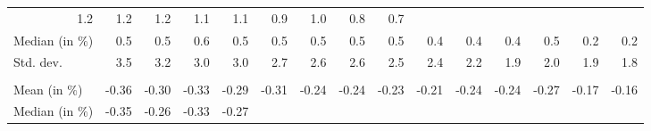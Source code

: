 \begin{tabular}{lllllllllllllll}
  \multicolumn{1}{r}{1.2} &
  \multicolumn{1}{r}{1.2} &
  \multicolumn{1}{r}{1.2} &
  \multicolumn{1}{r}{1.1} &
  \multicolumn{1}{r}{1.1} &
  \multicolumn{1}{r}{0.9} &
  \multicolumn{1}{r}{1.0} &
  \multicolumn{1}{r}{0.8} &
  \multicolumn{1}{r}{0.7} \\
\multicolumn{1}{l}{\hspace{2em}Median (in $\%$)} &
  \multicolumn{1}{|r}{0.5} &
  \multicolumn{1}{r}{0.5} &
  \multicolumn{1}{r}{0.6} &
  \multicolumn{1}{r}{0.5} &
  \multicolumn{1}{r}{0.5} &
  \multicolumn{1}{r}{0.5} &
  \multicolumn{1}{r}{0.5} &
  \multicolumn{1}{r}{0.5} &
  \multicolumn{1}{r}{0.4} &
  \multicolumn{1}{r}{0.4} &
  \multicolumn{1}{r}{0.4} &
  \multicolumn{1}{r}{0.5} &
  \multicolumn{1}{r}{0.2} &
  \multicolumn{1}{r}{0.2} \\
\multicolumn{1}{l}{\hspace{2em}Std. dev.} &
  \multicolumn{1}{|r}{3.5} &
  \multicolumn{1}{r}{3.2} &
  \multicolumn{1}{r}{3.0} &
  \multicolumn{1}{r}{3.0} &
  \multicolumn{1}{r}{2.7} &
  \multicolumn{1}{r}{2.6} &
  \multicolumn{1}{r}{2.6} &
  \multicolumn{1}{r}{2.5} &
  \multicolumn{1}{r}{2.4} &
  \multicolumn{1}{r}{2.2} &
  \multicolumn{1}{r}{1.9} &
  \multicolumn{1}{r}{2.0} &
  \multicolumn{1}{r}{1.9} &
  \multicolumn{1}{r}{1.8} \\
\multicolumn{1}{l}{\hspace{1em}{\textit{Elasticity} ($\widehat{\beta}$)}} &
  \multicolumn{1}{|r}{} &
  \multicolumn{1}{r}{} &
  \multicolumn{1}{r}{} &
  \multicolumn{1}{r}{} &
  \multicolumn{1}{r}{} &
  \multicolumn{1}{r}{} &
  \multicolumn{1}{r}{} &
  \multicolumn{1}{r}{} &
  \multicolumn{1}{r}{} &
  \multicolumn{1}{r}{} &
  \multicolumn{1}{r}{} &
  \multicolumn{1}{r}{} &
  \multicolumn{1}{r}{} &
  \multicolumn{1}{r}{} \\
\multicolumn{1}{l}{\hspace{2em}Mean (in $\%$)} &
  \multicolumn{1}{|r}{-0.36} &
  \multicolumn{1}{r}{-0.30} &
  \multicolumn{1}{r}{-0.33} &
  \multicolumn{1}{r}{-0.29} &
  \multicolumn{1}{r}{-0.31} &
  \multicolumn{1}{r}{-0.24} &
  \multicolumn{1}{r}{-0.24} &
  \multicolumn{1}{r}{-0.23} &
  \multicolumn{1}{r}{-0.21} &
  \multicolumn{1}{r}{-0.24} &
  \multicolumn{1}{r}{-0.24} &
  \multicolumn{1}{r}{-0.27} &
  \multicolumn{1}{r}{-0.17} &
  \multicolumn{1}{r}{-0.16} \\
\multicolumn{1}{l}{\hspace{2em}Median (in $\%$)} &
  \multicolumn{1}{|r}{-0.35} &
  \multicolumn{1}{r}{-0.26} &
  \multicolumn{1}{r}{-0.33} &
  \multicolumn{1}{r}{-0.27} &

\end{tabular}
